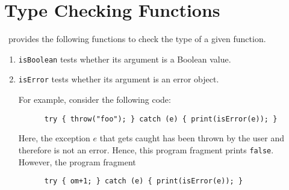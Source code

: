 \section{Type Checking Functions}
\setlx\ provides the following functions to check the type of a given function.
\begin{enumerate}
\item \texttt{isBoolean} tests whether its argument is a Boolean value.
\item \texttt{isError} tests whether its argument is an error object.

      For example, consider the following code:
      \begin{verbatim}
      try { throw("foo"); } catch (e) { print(isError(e)); }
      \end{verbatim}
      \vspace*{-0.5cm}

      Here, the exception $e$ that gets caught has been thrown by the user and therefore
      is not an error.  Hence, this program fragment prints \texttt{false}.
      However, the program fragment
      \begin{verbatim}
      try { om+1; } catch (e) { print(isError(e)); }
      \end{verbatim}
      \vspace*{-0.5cm}


\end{enumerate}
